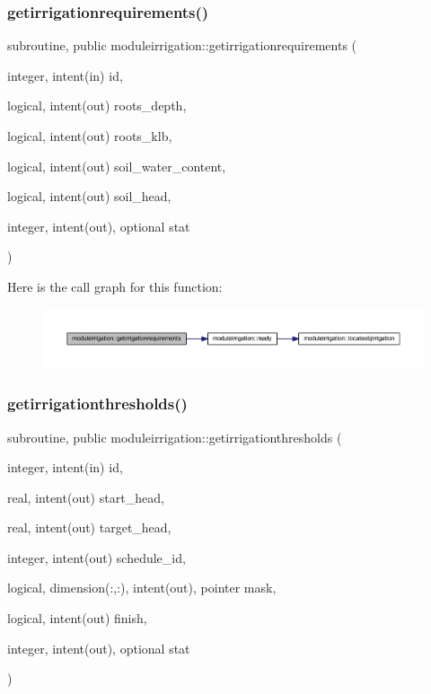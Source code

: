 \subsubsection{\texorpdfstring{getirrigationrequirements()}{getirrigationrequirements()}}
{\footnotesize\ttfamily subroutine, public moduleirrigation\+::getirrigationrequirements (\begin{DoxyParamCaption}\item[{integer, intent(in)}]{id,  }\item[{logical, intent(out)}]{roots\+\_\+depth,  }\item[{logical, intent(out)}]{roots\+\_\+klb,  }\item[{logical, intent(out)}]{soil\+\_\+water\+\_\+content,  }\item[{logical, intent(out)}]{soil\+\_\+head,  }\item[{integer, intent(out), optional}]{stat }\end{DoxyParamCaption})}

Here is the call graph for this function\+:\nopagebreak
\begin{figure}[H]
\begin{center}
\leavevmode
\includegraphics[width=350pt]{namespacemoduleirrigation_a23127929f74fe2c391dc8ddec9c8d44d_cgraph}
\end{center}
\end{figure}
\mbox{\label{namespacemoduleirrigation_a64c49f7b68195826fe0693bf10d5cc26}} 
\subsubsection{\texorpdfstring{getirrigationthresholds()}{getirrigationthresholds()}}
{\footnotesize\ttfamily subroutine, public moduleirrigation\+::getirrigationthresholds (\begin{DoxyParamCaption}\item[{integer, intent(in)}]{id,  }\item[{real, intent(out)}]{start\+\_\+head,  }\item[{real, intent(out)}]{target\+\_\+head,  }\item[{integer, intent(out)}]{schedule\+\_\+id,  }\item[{logical, dimension(\+:,\+:), intent(out), pointer}]{mask,  }\item[{logical, intent(out)}]{finish,  }\item[{integer, intent(out), optional}]{stat }\end{DoxyParamCaption})}

